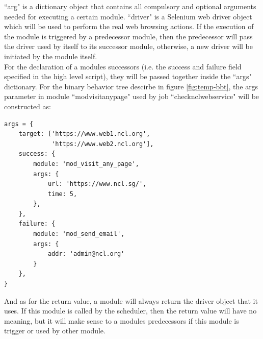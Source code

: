 \documentclass[12pt]{report}
\begin{document}
``arg" is a dictionary object that contains all compulsory and optional arguments needed for executing a certain module. ``driver" is a Selenium web driver object which will be used to perform the real web browsing actions. If the execution of the module is triggered by a predecessor module, then the predecessor will pass the driver used by itself to its successor module, otherwise, a new driver will be initiated by the module itself.\\

For the declaration of a module\textquotesingle s successors (i.e. the success and failure field specified in the high level script), they will be passed together inside the ``args" dictionary. For the binary behavior tree descirbe in figure \ref{fig:temp-bbt}, the args parameter in module ``mod\textunderscore visit\textunderscore any\textunderscore page" used by job ``check\textunderscore ncl\textunderscore web\textunderscore service" will be constructed as:

\begin{lstlisting}
args = {
    target: ['https://www.web1.ncl.org',
             'https://www.web2.ncl.org'],
    success: {
        module: 'mod_visit_any_page',
        args: {
            url: 'https://www.ncl.sg/',
            time: 5,
        },
    },
    failure: {
        module: 'mod_send_email',
        args: {
            addr: 'admin@ncl.org'
        }
    },
}
\end{lstlisting}

And as for the return value, a module will always return the driver object that it uses. If this module is called by the scheduler, then the return value will have no meaning, but it will make sense to a module\textquotesingle s predecessors if this module is trigger or used by other module. \\
\end{document}
